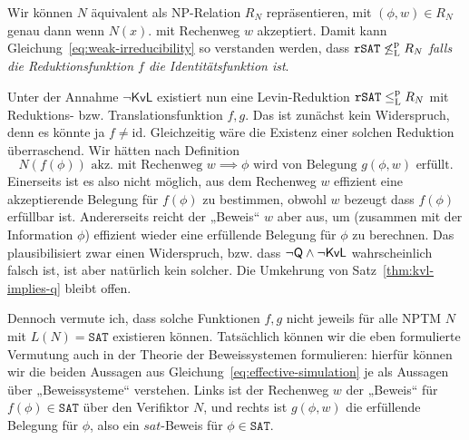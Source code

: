 Wir können $N$ äquivalent als NP-Relation $R_N$ repräsentieren, mit $(\phi, w) \in R_N$ genau dann wenn $N(x)$. mit Rechenweg $w$ akzeptiert.
Damit kann Gleichung~\ref{eq:weak-irreducibility} so verstanden werden, dass $\mathtt{rSAT} \not\leq_\mathrm{L}^\mathrm{p} R_N$ \emph{falls die Reduktionsfunktion $f$ die Identitätsfunktion ist}.

Unter der Annahme $\neg\mathsf{KvL}$ existiert nun eine Levin-Reduktion $\mathtt{rSAT}\leq_\mathrm{L}^\mathrm{p} R_N$ mit Reduktions- bzw. Translationsfunktion $f,g$. Das ist zunächst kein Widerspruch, denn es könnte ja $f\neq\mathrm{id}$.
%
%
Gleichzeitig wäre die Existenz einer solchen Reduktion überraschend. Wir hätten nach Definition
\begin{equation}\label{eq:effective-simulation} N(f(\phi)) \text{ akz. mit Rechenweg $w$} \implies \phi \text{ wird von Belegung $g(\phi, w)$ erfüllt}. \end{equation}
Einerseits ist es also nicht möglich, aus dem Rechenweg $w$ effizient eine akzeptierende Belegung für $f(\phi)$ zu bestimmen, obwohl $w$ bezeugt dass $f(\phi)$ erfüllbar ist.
Andererseits reicht der „Beweis“ $w$ aber aus, um (zusammen mit der Information $\phi$) effizient wieder eine erfüllende Belegung für $\phi$ zu berechnen. 
Das plausibilisiert zwar einen Widerspruch, bzw. dass $\neg\mathsf{Q}\land\neg\mathsf{KvL}$ wahrscheinlich falsch ist, ist aber natürlich kein solcher. Die Umkehrung von Satz~\ref{thm:kvl-implies-q} bleibt offen.

Dennoch vermute ich, dass solche Funktionen $f,g$ nicht jeweils für alle NPTM $N$ mit $L(N)=\mathtt{SAT}$ existieren können.
Tatsächlich können wir die eben formulierte Vermutung auch in der Theorie der Beweissystemen formulieren: hierfür können wir die beiden Aussagen aus Gleichung~\ref{eq:effective-simulation} je als Aussagen über „Beweissysteme“ verstehen. Links ist der Rechenweg $w$ der „Beweis“ für $f(\phi)\in \mathtt{SAT}$ über den Verifiktor $N$, und rechts ist $g(\phi, w)$ die erfüllende Belegung für $\phi$, also ein $\mathit{sat}$-Beweis für $\phi\in\mathtt{SAT}$.

